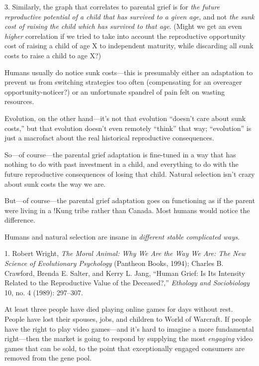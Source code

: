 {
 3. Similarly, the graph that correlates to parental grief is for
\textit{the future reproductive potential of a child that has survived
to a given age}, and not \textit{the sunk cost of raising the child
which has survived to that age}. (Might we get an even \textit{higher}
correlation if we tried to take into account the reproductive
opportunity cost of raising a child of age X to independent maturity,
while discarding all sunk costs to raise a child to age X?)

 Humans usually do notice sunk costs---this is presumably either an
adaptation to prevent us from switching strategies too often
(compensating for an overeager opportunity-noticer?) or an unfortunate
spandrel of pain felt on wasting resources.

 Evolution, on the other hand---it's not that
evolution ``doesn't care about sunk
costs,'' but that evolution doesn't
even remotely ``think'' that way;
``evolution'' is just a macrofact
about the real historical reproductive consequences.

 So---of course---the parental grief adaptation is fine-tuned in a
way that has nothing to do with past investment in a child, and
everything to do with the future reproductive consequences of losing
that child. Natural selection isn't crazy about sunk
costs the way we are.

 But---of course---the parental grief adaptation goes on
functioning as if the parent were living in a !Kung tribe rather than
Canada. Most humans would notice the difference.

 Humans and natural selection are insane in \textit{different
stable complicated ways}.}

\myendsectiontext


\bigskip

{
 1. Robert Wright, \textit{The Moral Animal: Why We Are the Way We
Are: The New Science of Evolutionary Psychology} (Pantheon Books,
1994); Charles B. Crawford, Brenda E. Salter, and Kerry L. Jang,
``Human Grief: Is Its Intensity Related to the
Reproductive Value of the Deceased?,''
\textit{Ethology and Sociobiology} 10, no. 4 (1989): 297--307.}


{
 At least three people have died playing online games for days
without rest. People have lost their spouses, jobs, and children to
World of Warcraft. If people have the right to play video games---and
it's hard to imagine a more fundamental right---then
the market is going to respond by supplying the most \textit{engaging}
video games that can be sold, to the point that exceptionally engaged
consumers are removed from the gene pool. }

